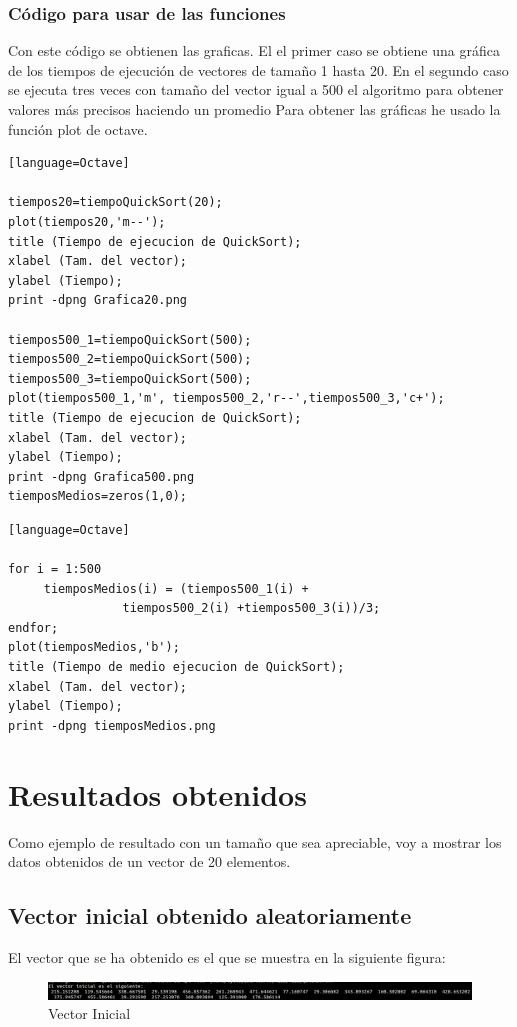 \documentclass[a4,12pt]{article}
\begin{document}
\subsubsection{Código para usar de las funciones}
Con este código se obtienen las graficas. El el primer caso se obtiene una gráfica de los tiempos de ejecución de vectores de tamaño 1 hasta 20. En el segundo caso se ejecuta tres veces con tamaño del vector igual a 500 el algoritmo  para obtener valores más precisos haciendo un promedio
Para obtener las gráficas he usado la función plot de octave.
\bigskip %
\lstset{language=Octave}
\begin{lstlisting}[frame=single][language=Octave]

tiempos20=tiempoQuickSort(20);
plot(tiempos20,'m--');
title (Tiempo de ejecucion de QuickSort);
xlabel (Tam. del vector);
ylabel (Tiempo);
print -dpng Grafica20.png 

tiempos500_1=tiempoQuickSort(500);
tiempos500_2=tiempoQuickSort(500);
tiempos500_3=tiempoQuickSort(500);
plot(tiempos500_1,'m', tiempos500_2,'r--',tiempos500_3,'c+');
title (Tiempo de ejecucion de QuickSort);
xlabel (Tam. del vector);
ylabel (Tiempo);
print -dpng Grafica500.png 
tiemposMedios=zeros(1,0);
\end{lstlisting}
\bigskip %
\bigskip %
\bigskip %
\begin{lstlisting}[frame=single][language=Octave]

for i = 1:500
     tiemposMedios(i) = (tiempos500_1(i) +
     			tiempos500_2(i) +tiempos500_3(i))/3;
endfor;
plot(tiemposMedios,'b');
title (Tiempo de medio ejecucion de QuickSort);
xlabel (Tam. del vector);
ylabel (Tiempo);
print -dpng tiemposMedios.png 
\end{lstlisting}
\section{Resultados obtenidos}
Como ejemplo de resultado con un tamaño que sea apreciable, voy a mostrar los datos obtenidos de un vector de 20 elementos.
\subsection{Vector inicial obtenido aleatoriamente}
El vector que se ha obtenido es el que se muestra en la siguiente figura:
\begin{figure}[h]
\includegraphics[width=1\textwidth]{Graficos/vectorInicial}
\caption{Vector Inicial}
\label{fig:vectorInicial}
\end{figure}
\end{document}

